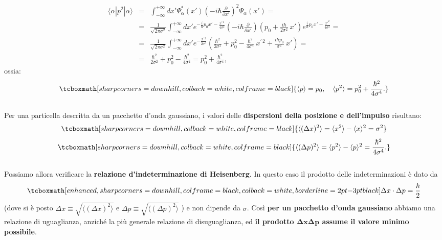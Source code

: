	\begin{eqnarray}
		\langle \alpha | p^2 | \alpha \rangle  &=& \int_{-\infty}^{+\infty} dx' \Psi ^* _\alpha(x') \left(-i \hbar \frac{\partial}{\partial x'} \right)^2 \Psi_\alpha(x') = \nonumber \\
		&=& \frac{1}{\sqrt{2 \pi \sigma^2}} \int_{-\infty}^{+\infty} dx' e^{-\frac{i}{\hbar}p_0 x' - \frac{x^{\prime \,2}}{4 \sigma^2}} \left(-i \hbar \frac{\partial}{\partial x'} \right)\left(p_0 + \frac{i \hbar}{2 \sigma^2} ~x' \right) e^{\frac{i}{\hbar}p_0 x' - \frac{x'^2}{4 \sigma^2}} = \nonumber \\
		&=& \frac{1}{\sqrt{2 \pi \sigma^2}} \int_{-\infty}^{+\infty} dx'  e^{- \frac{x^{\prime \,2}}{2 \sigma^2}} \left(\frac{\hbar^2}{2 \sigma^2} + p_0^2 - \frac{\hbar^2}{4 \sigma^4}~x^{\prime \,2} + \frac{i \hbar p_0}{\sigma^2}~x' \right) = \nonumber \\
		&=& \frac{\hbar^2}{2 \sigma^2} + p_0^2 - \frac{\hbar^2}{4 \sigma^4} = p_0^2 + \frac{\hbar^2}{4 \sigma^4},
\end{eqnarray}
ossia:
	\begin{equation}
		\tcboxmath[sharp corners=downhill, colback=white, colframe=black]{
			\langle p \rangle = p_0, \quad \langle p^2 \rangle = p_0^2 + \frac{\hbar^2}{4 \sigma^4}.
			}
	\end{equation}\\
	
Per una particella descritta da un pacchetto d'onda gaussiano, i valori delle \textbf{dispersioni della posizione e dell'impulso} risultano:
	\begin{equation}
		\tcboxmath[sharp corners=downhill, colback=white, colframe=black]{
		\langle (\Delta x)^2 \rangle = \langle x^2 \rangle - \langle x \rangle^2 = \sigma^2
		}
	\end{equation}
	\begin{equation}
		\tcboxmath[sharp corners=downhill, colback=white, colframe=black]{
			\langle (\Delta p)^2 \rangle = \langle p^2 \rangle - \langle p \rangle^2 =  \frac{\hbar^2}{4 \sigma^4}.
			}
	\end{equation}\\
	
Possiamo allora verificare la \textbf{relazione d'indeterminazione di Heisenberg}. In questo caso il prodotto delle indeterminazioni è dato da
	\begin{equation}
		\tcboxmath[enhanced, sharp corners=downhill, colframe=black, colback=white, borderline={2pt}{-3pt}{black}]{
		\Delta x \cdot \Delta p = \frac{\hbar}{2}
		}
	\end{equation}
(dove si è posto $\Delta x \equiv \sqrt{\langle (\Delta x)^2 \rangle}$ e $\Delta p \equiv \sqrt{\langle (\Delta p)^2 \rangle}$ ) e non dipende da $\sigma$. Così \textbf{per un pacchetto d'onda gaussiano} abbiamo una relazione di uguaglianza, anziché la più generale relazione di disuguaglianza, ed \textbf{il prodotto $\mathbf{\Delta x \Delta p}$ assume il valore minimo possibile}.\\

